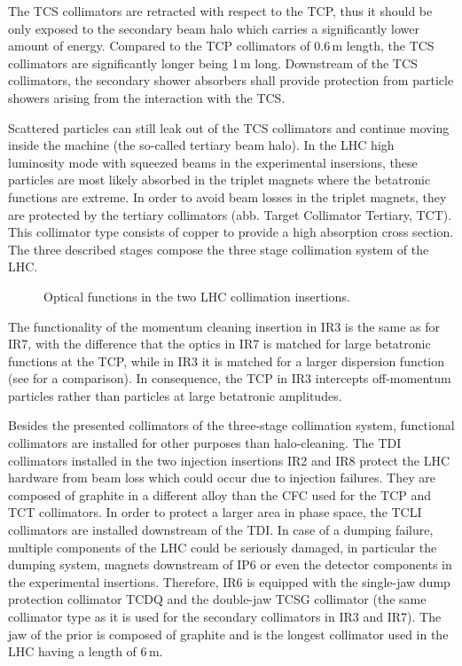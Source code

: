 The TCS collimators are retracted with respect to the TCP, thus it should be only exposed to the secondary beam halo which carries a significantly lower amount of energy. Compared to the TCP collimators of 0.6$\,$m length, the TCS collimators are significantly longer being 1$\,$m long. Downstream of the TCS collimators, the secondary shower absorbers shall provide protection from particle showers arising from the interaction with the TCS.

Scattered particles can still leak out of the TCS collimators and continue moving inside the machine (the so-called tertiary beam halo). In the LHC high luminosity mode with squeezed beams in the experimental insersions, these particles are most likely absorbed in the triplet magnets where the betatronic functions are extreme. In order to avoid beam losses in the triplet magnets, they are protected by the tertiary collimators (abb. Target Collimator Tertiary, TCT). This collimator type consists of copper to provide a high absorption cross section. The three described stages compose the three stage collimation system of the LHC.

\begin{figure}
\centering
\resizebox{1.0\textwidth}{!}{}
\resizebox{1.0\textwidth}{!}{}
\caption{Optical functions in the two LHC collimation insertions.}
\label{pic:14121222}
\end{figure}

The functionality of the momentum cleaning insertion in IR3 is the same as for IR7, with the difference that the optics in IR7 is matched for large betatronic functions at the TCP, while in IR3 it is matched for a larger dispersion function (see  for a comparison). In consequence, the TCP in IR3 intercepts off-momentum particles rather than particles at large betatronic amplitudes. 

Besides the presented collimators of the three-stage collimation system, functional collimators are installed for other purposes than halo-cleaning. The TDI collimators installed in the two injection insertions IR2 and IR8 protect the LHC hardware from beam loss which could occur due to injection failures. They are composed of graphite in a different alloy than the CFC used for the TCP and TCT collimators. In order to protect a larger area in phase space, the TCLI collimators are installed downstream of the TDI. In case of a dumping failure, multiple components of the LHC could be seriously damaged, in particular the dumping system, magnets downstream of IP6 or even the detector components in the experimental insertions. Therefore, IR6 is equipped with the single-jaw dump protection collimator TCDQ and the double-jaw TCSG collimator (the same collimator type as it is used for the secondary collimators in IR3 and IR7). The jaw of the prior is composed of graphite and is the longest collimator used in the LHC having a length of 6$\,$m. 

